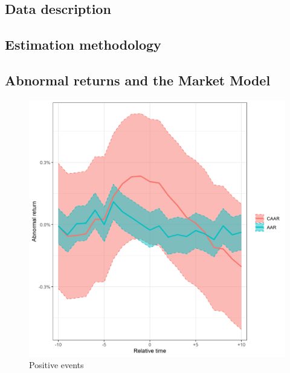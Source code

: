 
\subsection{Data description}


\subsection{Estimation methodology}


\subsection{Abnormal returns and the Market Model}





\begin{figure}[!tbp]
  \centering
 \begin{minipage}[b]{0.45\textwidth}
    \includegraphics[scale=0.45]{Projekt/1.Figures analysis/ST_positive_all_CI.png}
    \caption{Positive events}
  \end{minipage}
  \hfill
  \begin{minipage}[b]{0.45\textwidth}

\end{minipage}
\end{figure}
